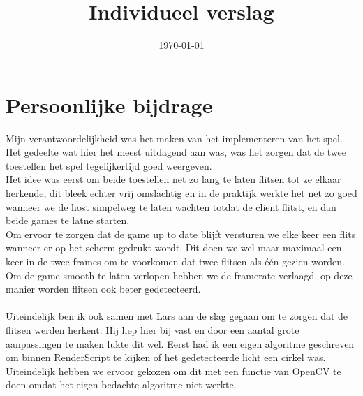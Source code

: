 \documentclass{uva-inf-article}
\title{Individueel verslag}
\date{\today}
\begin{document}
\maketitle




\section{Persoonlijke bijdrage}
Mijn verantwoordelijkheid was het maken van het implementeren van het spel. Het
gedeelte wat hier het meest uitdagend aan was, was het zorgen dat de twee toestellen
het spel tegelijkertijd goed weergeven.
\\Het idee was eerst om beide toestellen net zo lang te laten flitsen tot ze elkaar
herkende, dit bleek echter vrij omslachtig en in de praktijk werkte het net zo goed
wanneer we de host simpelweg te laten wachten totdat de client flitst, en dan beide
games te latne starten.
\\Om ervoor te zorgen dat de game up to date blijft versturen we elke keer een flits
wanneer er op het scherm gedrukt wordt. Dit doen we wel maar maximaal een keer in
de twee frames om te voorkomen dat twee flitsen als \'{e}\'{e}n gezien worden.
\\Om de game smooth te laten verlopen hebben we de framerate verlaagd, op deze
manier worden flitsen ook beter gedetecteerd.
\\\\Uiteindelijk ben ik ook samen met Lars aan de slag gegaan om te zorgen dat de
flitsen werden herkent. Hij liep hier bij vast en door een aantal grote aanpassingen
te maken lukte dit wel. Eerst had ik een eigen algoritme geschreven om binnen
RenderScript te kijken of het gedetecteerde licht een cirkel was. Uiteindelijk hebben
we ervoor gekozen om dit met een functie van OpenCV te doen omdat het eigen bedachte
algoritme niet werkte.



\end{document}
